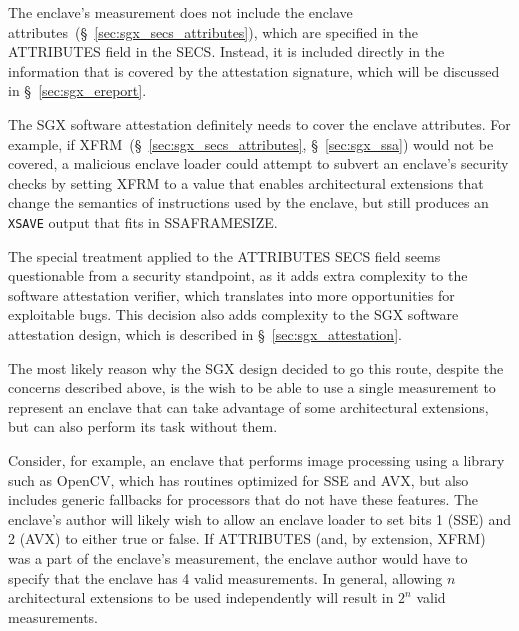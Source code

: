 \label{sec:sgx_ecreate_mrenclave_no_attributes}

The enclave's measurement does not include the enclave
attributes~(\S~\ref{sec:sgx_secs_attributes}), which are specified in the
ATTRIBUTES field in the SECS. Instead, it is included directly in the
information that is covered by the attestation signature, which will be
discussed in \S~\ref{sec:sgx_ereport}.

The SGX software attestation definitely needs to cover the enclave attributes.
For example, if XFRM~(\S~\ref{sec:sgx_secs_attributes}, \S~\ref{sec:sgx_ssa})
would not be covered, a malicious enclave loader could attempt to subvert an
enclave's security checks by setting XFRM to a value that enables architectural
extensions that change the semantics of instructions used by the enclave, but
still produces an \texttt{XSAVE} output that fits in SSAFRAMESIZE.

The special treatment applied to the ATTRIBUTES SECS field seems questionable
from a security standpoint, as it adds extra complexity to the software
attestation verifier, which translates into more opportunities for exploitable
bugs. This decision also adds complexity to the SGX software attestation
design, which is described in \S~\ref{sec:sgx_attestation}.

The most likely reason why the SGX design decided to go this route, despite the
concerns described above, is the wish to be able to use a single measurement to
represent an enclave that can take advantage of some architectural extensions,
but can also perform its task without them.

Consider, for example, an enclave that performs image processing using a
library such as OpenCV, which has routines optimized for SSE and AVX, but also
includes generic fallbacks for processors that do not have these features. The
enclave's author will likely wish to allow an enclave loader to set bits 1
(SSE) and 2 (AVX) to either true or false. If ATTRIBUTES (and, by extension,
XFRM) was a part of the enclave's measurement, the enclave author would have to
specify that the enclave has 4 valid measurements. In general, allowing $n$
architectural extensions to be used independently will result in $2^n$ valid
measurements.


\label{sec:sgx_eadd_mrenclave}



